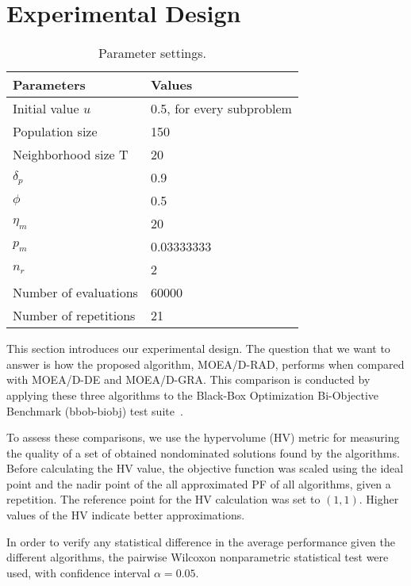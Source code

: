 \section{Experimental Design}

\begin{table}[!t]
	\centering
\begin{tabular}{@{}|l|l|@{}}
		\toprule
		\textbf{Parameters}   & \textbf{Values}          \\ \midrule
		Initial value $u$     & 0.5, for every subproblem \\ 
		Population size       & 150                      \\
		Neighborhood size T & 20 \\ 
		$\delta_p$ & 0.9 \\ 
		$\phi$ & 0.5 \\ 
		$\eta_m$ & 20 \\
		$p_m$ & 0.03333333 \\
		$n_r$ & 2 \\
		\midrule
		Number of evaluations & 60000 		\\		
		Number of repetitions & 21                  \\ \bottomrule

	\end{tabular}
\vspace{1em}
\caption{Parameter settings.}
\end{table}



This section introduces our experimental design. The question that we want to answer is how the proposed algorithm, MOEA/D-RAD, performs when compared with MOEA/D-DE and MOEA/D-GRA. This comparison is conducted by applying these three algorithms to the Black-Box Optimization Bi-Objective Benchmark (bbob-biobj) test suite~\cite{tusar2016coco}.

To assess these comparisons, we use the hypervolume (HV) metric for measuring the quality of a set of obtained nondominated solutions found by the algorithms. Before calculating the HV value, the objective function was scaled using the ideal point and the nadir point of the all approximated PF of all algorithms, given a repetition. The reference point for the HV calculation was set to $(1, 1)$. Higher values of the HV indicate better approximations.

In order to verify any statistical difference in the average performance given the different algorithms, the pairwise Wilcoxon nonparametric statistical test were used, with confidence interval $\alpha = 0.05$. 
